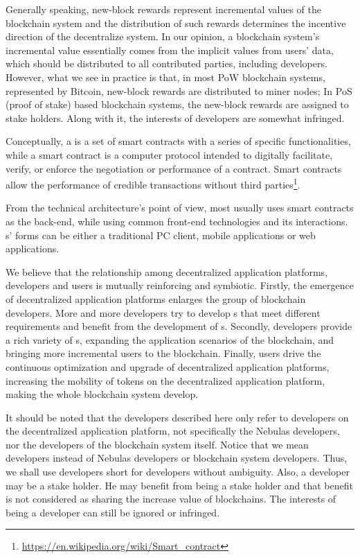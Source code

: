 Generally speaking,  new-block rewards represent incremental values of the
blockchain system and the distribution of such rewards determines the incentive
direction of the decentralize system. In our opinion, a blockchain system's
incremental value essentially comes from the implicit values from users' data,
which should be distributed to all contributed parties, including \dapp
developers. However, what we see in practice is that, in most PoW blockchain
systems, represented by Bitcoin, new-block rewards are distributed to miner
nodes; In PoS (proof of stake) based blockchain systems, the new-block rewards are assigned to  stake holders. Along with it, the interests of \dapp developers are somewhat infringed.


Conceptually, a \dapp is a set of smart contracts with a series of specific
functionalities, while a smart contract is a computer protocol intended to
digitally facilitate, verify, or enforce the negotiation or performance of a
contract. Smart contracts allow the performance of credible transactions
without third
parties\footnote{\url{https://en.wikipedia.org/wiki/Smart\_contract}}.

From the technical architecture's point of view, most \dapp usually uses smart contracts as the back-end, while using common front-end technologies and its interactions. {\dapp}s' forms can be either a traditional PC client, mobile applications or web applications.

We believe that the relationship among decentralized application platforms, \dapp developers and \dapp users is mutually reinforcing and symbiotic. Firstly, the emergence of decentralized application platforms enlarges the group of blockchain developers. More and more developers try to develop {\dapp}s that meet different requirements and benefit from the development of {\dapp}s. Secondly, \dapp developers provide a rich variety of {\dapp}s, expanding the application scenarios of the blockchain, and bringing more incremental users to the blockchain. Finally, \dapp users drive the continuous optimization and upgrade of decentralized application platforms, increasing the mobility of tokens on the decentralized application platform, making the whole blockchain system develop.

It should be noted that the developers described here only refer to developers on the decentralized application platform, not specifically the Nebulas developers, nor the developers of the blockchain system itself.
Notice that we mean \dapp developers instead of Nebulas \dapp developers or
blockchain system developers. Thus, we shall use developers short for \dapp
developers without ambiguity. Also, a \dapp developer may be a stake holder.
He may benefit from being a stake holder and that benefit is not considered
as sharing the increase value of blockchains. The interests of being a developer can still be ignored or infringed.


